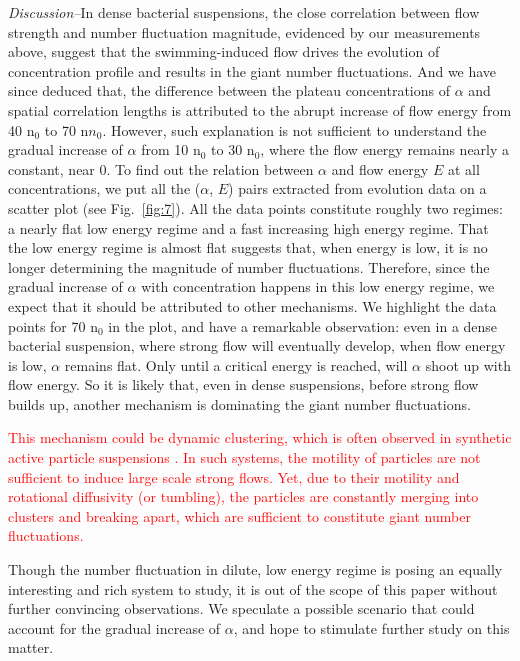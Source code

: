 \documentclass[twocolumn,aps,prl,amsmath,amssymb,longbibliography]{revtex4-2}
\begin{document}
\textit{Discussion--}In dense bacterial suspensions, the close correlation between flow strength and number fluctuation magnitude, evidenced by our measurements above, suggest that the swimming-induced flow drives the evolution of concentration profile and results in the giant number fluctuations. And we have since deduced that, the difference between the plateau concentrations of $\alpha$ and spatial correlation lengths is attributed to the abrupt increase of flow energy from 40 n$_0$ to 70 n$n_0$. However, such explanation is not sufficient to understand the gradual increase of $\alpha$ from 10 n$_0$ to 30 n$_0$, where the flow energy remains nearly a constant, near 0. To find out the relation between $\alpha$ and flow energy $E$ at all concentrations, we put all the ($\alpha$, $E$) pairs extracted from evolution data on a scatter plot (see Fig.~\ref{fig:7}). All the data points constitute roughly two regimes: a nearly flat low energy regime and a fast increasing high energy regime. That the low energy regime is almost flat suggests that, when energy is low, it is no longer determining the magnitude of number fluctuations. Therefore, since the gradual increase of $\alpha$ with concentration happens in this low energy regime, we expect that it should be attributed to other mechanisms. We highlight the data points for 70 n$_0$ in the plot, and have a remarkable observation: even in a dense bacterial suspension, where strong flow will eventually develop, when flow energy is low, $\alpha$ remains flat. Only until a critical energy is reached, will $\alpha$ shoot up with flow energy. So it is likely that, even in dense suspensions, before strong flow builds up, another mechanism is dominating the giant number fluctuations.

\textcolor{red}{This mechanism could be dynamic clustering, which is often observed in synthetic active particle suspensions
 \cite{PhysRevLett.108.268303, Palacci2013, PhysRevLett.123.208002}. In such systems, the motility of particles are not sufficient to induce large scale strong flows. Yet, due to their motility and rotational diffusivity (or tumbling), the particles are constantly merging into clusters and breaking apart, which are sufficient to constitute giant number fluctuations.}

Though the number fluctuation in dilute, low energy regime is posing an equally interesting and rich system to study, it is out of the scope of this paper without further convincing observations. We speculate a possible scenario that could account for the gradual increase of $\alpha$, and hope to stimulate further study on this matter.
\end{document}
